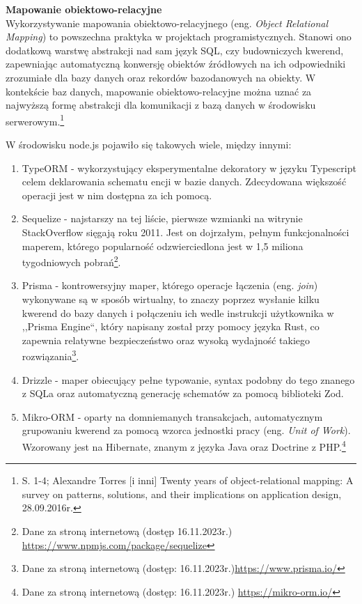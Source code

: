 \documentclass[12pt, a4paper, twoside, openany]{book}
\newcommand{\forceindent}{\leavevmode{\parindent=1.3em\indent}}
\begin{document}
\textbf{Mapowanie obiektowo-relacyjne\\}
\forceindent Wykorzystywanie mapowania obiektowo-relacyjnego (eng. \textit{Object Relational Mapping}) to powszechna praktyka w projektach programistycznych.
Stanowi ono dodatkową warstwę abstrakcji nad sam język SQL, czy budowniczych kwerend, zapewniając automatyczną konwersję obiektów źródłowych na ich odpowiedniki zrozumiałe dla bazy danych oraz rekordów bazodanowych na obiekty.
W kontekście baz danych, mapowanie obiektowo-relacyjne można uznać za najwyższą formę abstrakcji dla komunikacji z bazą danych w środowisku serwerowym.\footnote{S. 1-4; Alexandre Torres [i inni] Twenty years of object-relational mapping: A survey on patterns, solutions, and their implications on application design, 28.09.2016r.}

W środowisku node.js pojawiło się takowych wiele, między innymi:
\begin{enumerate}[label=--]
    \item TypeORM - wykorzystujący eksperymentalne dekoratory w języku Typescript celem deklarowania schematu encji w bazie danych. Zdecydowana większość operacji jest w nim dostępna za ich pomocą.
    \item Sequelize - najstarszy na tej liście, pierwsze wzmianki na witrynie StackOverflow sięgają roku 2011. Jest on dojrzałym, pełnym funkcjonalności maperem, którego popularność odzwierciedlona jest w 1,5 miliona tygodniowych pobrań\footnote{Dane za stroną internetową (dostęp 16.11.2023r.) \url{https://www.npmjs.com/package/sequelize}}.
    \item Prisma - kontrowersyjny maper, którego operacje łączenia (eng. \textit{join}) wykonywane są w sposób wirtualny, to znaczy poprzez wysłanie kilku kwerend do bazy danych i połączeniu ich wedle instrukcji użytkownika w ,,Prisma Engine``, który napisany został przy pomocy języka Rust, co zapewnia relatywne bezpieczeństwo oraz wysoką wydajność takiego rozwiązania\footnote{Dane za stroną internetową (dostęp: 16.11.2023r.)\url{https://www.prisma.io/}}.
    \item Drizzle - maper obiecujący pełne typowanie, syntax podobny do tego znanego z SQLa oraz automatyczną generację schematów za pomocą biblioteki Zod.
    \item Mikro-ORM - oparty na domniemanych transakcjach, automatycznym grupowaniu kwerend za pomocą wzorca jednostki pracy (eng. \textit{Unit of Work}). Wzorowany jest na Hibernate, znanym z języka Java oraz Doctrine z PHP.\footnote{Dane za stroną internetową (dostęp: 16.11.2023r.) \url{https://mikro-orm.io/}}
\end{enumerate}
\end{document}
